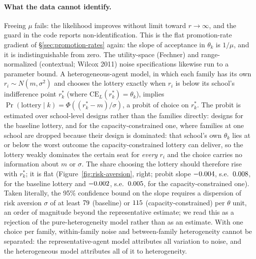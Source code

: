 \documentclass{article}
\begin{document}
\paragraph{What the data cannot identify.} Freeing $\mu$ fails: the likelihood improves without limit toward $r \to \infty$, and the guard in the code reports non-identification. This is the flat promotion-rate gradient of \S\ref{sec:promotion-rates} again: the slope of acceptance in $\theta_k$ is $1/\mu$, and it is indistinguishable from zero. The utility-space (Fechner) and range-normalized (contextual; Wilcox 2011) noise specifications likewise run to a parameter bound. A heterogeneous-agent model, in which each family has its own $r_i \sim N(m, \sigma^2)$ and chooses the lottery exactly when $r_i$ is below its school's indifference point $r^*_k$ (where $\mathrm{CE}_L(r^*_k) = \theta_k$), implies $\Pr(\text{lottery} \mid k) = \Phi((r^*_k - m)/\sigma)$, a probit of choice on $r^*_k$. The probit is estimated over school-level designs rather than the \numEligibleFamilies{} families directly: \numRiskDesignsBase{} designs for the baseline lottery, and \numRiskDesignsCap{} for the capacity-constrained one, where \numRiskDroppedCap{} families at one school are dropped because their design is dominated: that school's own $\theta_k$ lies at or below the worst outcome the capacity-constrained lottery can deliver, so the lottery weakly dominates the certain seat for \emph{every} $r_i$ and the choice carries no information about $m$ or $\sigma$. The share choosing the lottery should therefore rise with $r^*_k$; it is flat (Figure~\ref{fig:risk-aversion}, right; probit slope $-0.004$, s.e.\ $0.008$, for the baseline lottery and $-0.002$, s.e.\ $0.005$, for the capacity-constrained one). Taken literally, the 95\% confidence bound on the slope requires a dispersion of risk aversion $\sigma$ of at least $79$ (baseline) or $115$ (capacity-constrained) per $\theta$ unit, an order of magnitude beyond the representative estimate; we read this as a rejection of the pure-heterogeneity model rather than as an estimate. With one choice per family, within-family noise and between-family heterogeneity cannot be separated: the representative-agent model attributes all variation to noise, and the heterogeneous model attributes all of it to heterogeneity.
\end{document}
